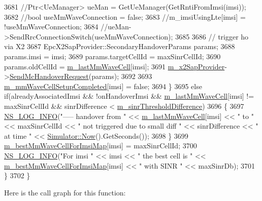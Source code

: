 \begin{DoxyCode}
3681       \textcolor{comment}{//Ptr<UeManager> ueMan = GetUeManager(GetRntiFromImsi(imsi));}
3682       \textcolor{comment}{//bool useMmWaveConnection = false;}
3683       \textcolor{comment}{//m\_imsiUsingLte[imsi] = !useMmWaveConnection;}
3684       \textcolor{comment}{//ueMan->SendRrcConnectionSwitch(useMmWaveConnection);}
3685 
3686       \textcolor{comment}{// trigger ho via X2}
3687       EpcX2SapProvider::SecondaryHandoverParams params;
3688       params.imsi = imsi;
3689       params.targetCellId = maxSinrCellId;
3690       params.oldCellId = \hyperlink{classns3_1_1LteEnbRrc_a0d7b04f0383b0dc3f6a7360b87cbaeee}{m\_lastMmWaveCell}[imsi];
3691       \hyperlink{classns3_1_1LteEnbRrc_ae8dc75f4f6f63b7736d86204a4beb415}{m\_x2SapProvider}->\hyperlink{classns3_1_1EpcX2SapProvider_a419d10f3f7f1808938a53439bed4f9eb}{SendMcHandoverRequest}(params);
3692 
3693       \hyperlink{classns3_1_1LteEnbRrc_ad19d6f4c123115e1d13e34609781ab20}{m\_mmWaveCellSetupCompleted}[imsi] = \textcolor{keyword}{false};
3694     \}
3695     \textcolor{keywordflow}{else} \textcolor{keywordflow}{if}(alreadyAssociatedImsi && !onHandoverImsi && \hyperlink{classns3_1_1LteEnbRrc_a0d7b04f0383b0dc3f6a7360b87cbaeee}{m\_lastMmWaveCell}[imsi] != 
      maxSinrCellId && sinrDifference < \hyperlink{classns3_1_1LteEnbRrc_aef56a65c644f6ed3c5f28a540ded624f}{m\_sinrThresholdDifference})
3696     \{
3697       \hyperlink{group__logging_gafbd73ee2cf9f26b319f49086d8e860fb}{NS\_LOG\_INFO}(\textcolor{stringliteral}{"----- handover from "} << \hyperlink{classns3_1_1LteEnbRrc_a0d7b04f0383b0dc3f6a7360b87cbaeee}{m\_lastMmWaveCell}[imsi] << \textcolor{stringliteral}{" to "} << 
      maxSinrCellId << \textcolor{stringliteral}{" not triggered due to small diff "} << sinrDifference << \textcolor{stringliteral}{" at time "} << 
      \hyperlink{classns3_1_1Simulator_ac3178fa975b419f7875e7105be122800}{Simulator::Now}().GetSeconds());
3698     \}
3699     \hyperlink{classns3_1_1LteEnbRrc_a38d5bf3d53b16596824f07d4b4a1eab7}{m\_bestMmWaveCellForImsiMap}[imsi] = maxSinrCellId;
3700     \hyperlink{group__logging_gafbd73ee2cf9f26b319f49086d8e860fb}{NS\_LOG\_INFO}(\textcolor{stringliteral}{"For imsi "} << imsi << \textcolor{stringliteral}{" the best cell is "} << 
      \hyperlink{classns3_1_1LteEnbRrc_a38d5bf3d53b16596824f07d4b4a1eab7}{m\_bestMmWaveCellForImsiMap}[imsi] << \textcolor{stringliteral}{" with SINR "} << maxSinrDb);
3701   \}
3702 \}
\end{DoxyCode}


Here is the call graph for this function\+:




